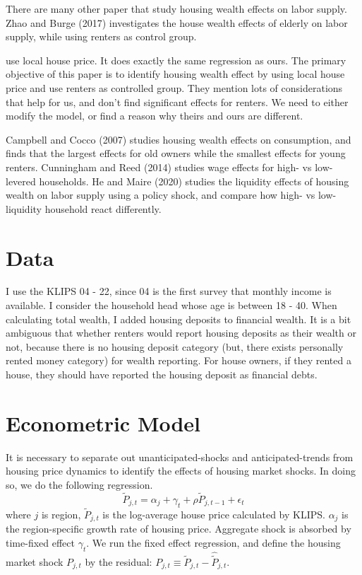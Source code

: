 \documentclass[10pt]{article}
\theoremstyle{definition}
\theoremstyle{remark}
\begin{document}
There are many other paper that study housing wealth effects on labor supply. Zhao and Burge (2017) investigates the house wealth effects of elderly on labor supply, while using renters as control group.

\cite{DG2018} use local house price. It does exactly the same regression as ours. The primary objective of this paper is to identify housing wealth effect by using local house price and use renters as controlled group. They mention lots of considerations that help for us, and don't find significant effects for renters. We need to either modify the model, or find a reason why theirs and ours are different. 

Campbell and Cocco (2007) studies housing wealth effects on consumption, and finds that the largest effects for old owners while the smallest effects for young renters. 
Cunningham and Reed (2014) studies wage effects for high- vs low- levered households. He and Maire (2020) studies the liquidity effects of housing wealth on labor supply using a policy shock, and compare how high- vs low- liquidity household react differently.

\section{Data}\label{sec:data}
I use the KLIPS 04 - 22, since 04 is the first survey that monthly income is available. I consider the household head whose age is between 18 - 40. When calculating total wealth, I added housing deposits to financial wealth. It is a bit ambiguous that whether renters would report housing deposits as their wealth or not, because there is no housing deposit category (but, there exists personally rented money category) for wealth reporting. For house owners, if they rented a house, they should have reported the housing deposit as financial debts.

\section{Econometric Model}\label{sec:model}
It is necessary to separate out unanticipated-shocks and anticipated-trends from housing price dynamics to identify the effects of housing market shocks. In doing so, we do the following regression.
\begin{equation}
    \tilde P_{j,t} = \alpha_j + \gamma_t + \rho \tilde P_{j,t-1} + \epsilon_t
\end{equation}where $j$ is region, $\tilde P_{j,t}$ is the log-average house price calculated by KLIPS. $\alpha_j$ is the region-specific growth rate of housing price. Aggregate shock is absorbed by time-fixed effect $\gamma_t$. We run the fixed effect regression, and define the housing market shock $P_{j,t}$ by the residual: $P_{j,t} \equiv \tilde P_{j,t} - \hat{\tilde P}_{j,t}$.
\end{document}
